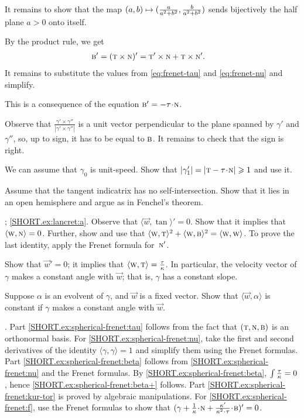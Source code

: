 \begin{multicols}{2}
{It remains to show that the map $(a,b) \z\mapsto (\frac{a}{a^2+b^2}, \frac{b}{a^2+b^2})$ sends bijectively the half plane $a>0$ onto itself.

}

 By the product rule, we get
\begin{align*}
\text{\sc{b}}'&=(\text{\sc{t}}\times \text{\sc{n}})'=
\text{\sc{t}}'\times \text{\sc{n}}+\text{\sc{t}}\times\text{\sc{n}}'.
\end{align*}
It remains to substitute the values from \ref{eq:frenet-tau} and \ref{eq:frenet-nu} and simplify.

This is a consequence of the equation $\bi' = - \tor\cdot \norm $.

Observe that $\tfrac{\gamma'\times\gamma''}{|\gamma'\times\gamma''|}$ is a unit vector perpendicular to the plane spanned by $\gamma'$ and $\gamma''$, so, up to sign, it has to be equal to $\text{\sc{b}}$.
It remains to check that the sign is right.

We can assume that $\gamma_0$ is unit-speed.
Show that
$|\gamma_1'|=|\tan-\tor\cdot \norm|\ge 1$ and use it.

 Assume that the tangent indicatrix has no self-intersection.
Show that it lies in an open hemisphere and argue as in Fenchel's theorem.

\parbf{\ref{ex:lancret}}; \ref{SHORT.ex:lancret:a}.
Observe that 
$\langle \vec w,\tan\rangle'=0$.
Show that it implies that $\langle \text{\sc{w}}, \text{\sc{n}}\rangle =0$.
Further, show and use that $\langle \text{\sc{w}}, \text{\sc{t}}\rangle^2+\langle \text{\sc{w}}, \text{\sc{b}}\rangle^2=\langle \text{\sc{w}}, \text{\sc{w}}\rangle$.
To prove the last identity, apply the Frenet formula for~$\text{\sc{n}}'$.

Show that $\vec w'=0$;
it implies that $\langle \vec w,\tan\rangle\z=\tfrac\tor\kur$.
In particular, the velocity vector of $\gamma$ makes a constant angle with $\vec w$; that is, $\gamma$ has a constant slope.

Suppose $\alpha$ is an evolvent of $\gamma$, and $\vec w$ is a fixed vector.
Show that $\langle \vec w,\alpha\rangle$ is constant if $\gamma$ makes a constant angle with $\vec w$.

\parbf{\ref{ex:spherical-frenet}}.
Part \ref{SHORT.ex:spherical-frenet:tau} follows from the fact that $(  \text{\sc{t}},\text{\sc{n}},\text{\sc{b}})$ is an orthonormal basis.
For \ref{SHORT.ex:spherical-frenet:nu}, take the first and second derivatives of the identity $\langle\gamma,\gamma\rangle=1$ and simplify them using the Frenet formulas.
Part \ref{SHORT.ex:spherical-frenet:beta} follows from \ref{SHORT.ex:spherical-frenet:nu} and the Frenet formulas.
By \ref{SHORT.ex:spherical-frenet:beta}, $\int\tfrac{\tau}{\kappa}=0$, hence \ref{SHORT.ex:spherical-frenet:beta+} follows.
Part \ref{SHORT.ex:spherical-frenet:kur-tor} is proved by algebraic manipulations.
For \ref{SHORT.ex:spherical-frenet:f},
use the Frenet formulas to show that $(\gamma+\tfrac1\kur\cdot \norm+\tfrac{\kur'}{\kur^2\cdot\tor}\cdot\bi)'=0$.


\end{multicols}
